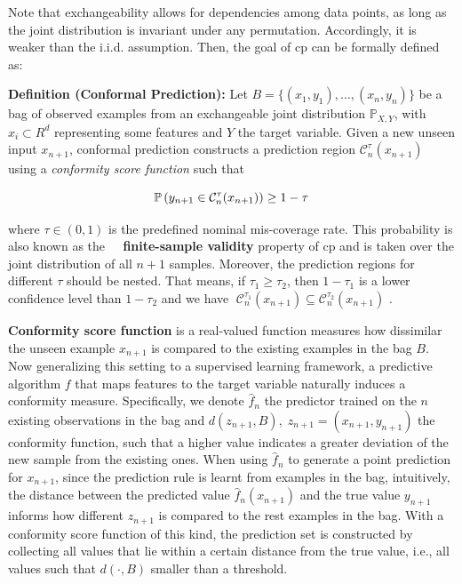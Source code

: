 \documentclass[a4paper,oneside,bibliography=totoc]{scrbook}
\begin{document}
\noindent Note that exchangeability allows for dependencies among data points, as long as the joint distribution is invariant under any permutation. Accordingly, it is weaker than the i.i.d. assumption. Then, the goal of \gls{cp} can be formally defined as: 
\newline

\noindent
\textbf{Definition (Conformal Prediction):}  Let \(B = \{(x_1, y_1), \dots, (x_n, y_n)\}\) be a bag of observed examples from an exchangeable joint distribution $\mathbb{P}_{X,Y}$, with $x_i \subset R^d$ representing some features and  $Y$ the target variable. Given a new unseen input \(x_{n+1}\), conformal prediction constructs a prediction region \( \mathcal{C}_n^\tau(x_{n+1}) \) using a \textit{conformity score function} such that
\vspace{0.7em}

\begin{equation}
\mathbb{P}\left( y_{n+1} \in \mathcal{C}_n^\tau(x_{n+1}) \right) \geq 1 - \tau
\vspace{1em}
\label{eq: finitecp}
\end{equation}

\noindent
where \( \tau \in (0, 1) \) is the predefined nominal mis-coverage rate. This probability is also known as the \textbf{finite-sample validity} property of \gls{cp} and is taken over the joint distribution of all \(n + 1\) samples. Moreover, the prediction regions for different $\tau$ should be nested. That means, if  $\tau_1 \ge \tau_2$, then $1 - \tau_1$ is a lower confidence level than $1 - \tau_2$ and we have $ \; \mathcal{C}_n^{\tau_1}(x_{n+1}) \subseteq \mathcal{C}_n^{\tau_2}(x_{n+1})$ \cite{shafer2008tutorial}.  

\vspace{0.7em}
\textbf{Conformity score function} is a real-valued function  measures how dissimilar the unseen example $x_{n+1}$ is compared to the existing examples in the bag $B$. Now generalizing this setting to a supervised learning framework, a predictive algorithm $f$ that maps features to the target variable naturally induces a conformity measure. Specifically, we denote $\hat{f}_n$ the predictor trained on the $n$ existing observations in the bag and $d(z_{n+1}, B), \; z_{n+1} = (x_{n+1}, y_{n+1})$ the conformity function, such that a higher value indicates a greater deviation of the new sample from the existing ones. When using $\hat{f}_n$ to generate a point prediction for $x_{n+1}$, since the prediction rule is learnt from examples in the bag, intuitively, the distance between the predicted value $\hat{f}_n(x_{n+1})$ and the true value $y_{n+1}$ informs how different $z_{n+1}$ is compared to the rest examples in the bag. With a conformity score function of this kind, the prediction set is constructed by collecting all values that lie within a certain distance from the true value, i.e., all values such that $d(\cdot, B)$ smaller than a threshold.
\end{document}
